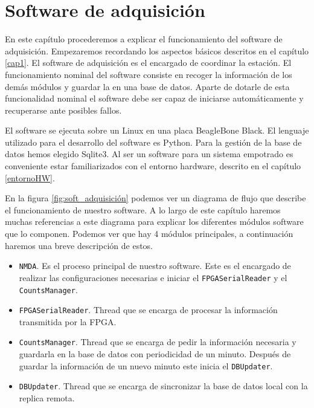 \chapter{Software de adquisición}
\label{cap2}
En este capítulo procederemos a explicar el funcionamiento del software de adquisición. Empezaremos recordando los aspectos básicos descritos en el
capítulo \ref{cap1}. El software de adquisición es el encargado de coordinar la estación. El funcionamiento nominal del software consiste en recoger
la información de los demás módulos y guardar la en una base de datos. Aparte de dotarle de esta funcionalidad nominal el software debe ser capaz de
iniciarse automáticamente y recuperarse ante posibles fallos.  
\par
El software se ejecuta sobre un Linux en una placa BeagleBone Black\cite{Beagle}\cite{BeagleWiki}. El lenguaje utilizado para el desarrollo del
software es Python\cite{Python}. Para la gestión de la base de datos hemos elegido Sqlite3\cite{Sqlite}. Al ser un software para un sistema empotrado
es conveniente estar familiarizados con el entorno hardware, descrito en el capítulo \ref{entornoHW}.
\par
En la figura \ref{fig:soft_adquisición} podemos ver un diagrama de flujo que describe el funcionamiento de nuestro software. A lo largo de este
capítulo haremos muchas referencias a este diagrama para explicar los diferentes módulos software que lo componen. Podemos ver que hay 4 módulos
principales, a continuación haremos una breve descripción de estos. 

\begin{itemize}
  	\item	\texttt{NMDA}. Es el proceso principal de nuestro software. Este es el encargado de realizar las configuraciones necesarias e iniciar
	  	el \texttt{FPGASerialReader} y el \texttt{CountsManager}.
	\item	\texttt{FPGASerialReader}. Thread que se encarga de procesar la información transmitida por la FPGA.
	\item	\texttt{CountsManager}. Thread que se encarga de pedir la información necesaria y guardarla en la base de datos con periodicidad de un
	  	minuto. Después de guardar la información de un nuevo minuto este inicia el \texttt{DBUpdater}.
	\item	\texttt{DBUpdater}. Thread que se encarga de sincronizar la base de datos local con la replica remota.
\end{itemize}

